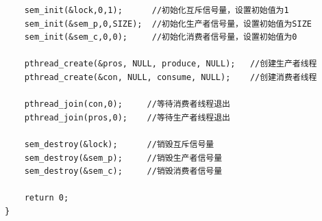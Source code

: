\documentclass[12pt, a4paper, oneside]{ctexbook}
\numberwithin{figure}{section}
\begin{document}
\begin{verbatim}
    sem_init(&lock,0,1);      //初始化互斥信号量，设置初始值为1
    sem_init(&sem_p,0,SIZE);  //初始化生产者信号量，设置初始值为SIZE
    sem_init(&sem_c,0,0);     //初始化消费者信号量，设置初始值为0
    
    pthread_create(&pros, NULL, produce, NULL);   //创建生产者线程
    pthread_create(&con, NULL, consume, NULL);    //创建消费者线程

    pthread_join(con,0);     //等待消费者线程退出
    pthread_join(pros,0);    //等待生产者线程退出

    sem_destroy(&lock);      //销毁互斥信号量
    sem_destroy(&sem_p);     //销毁生产者信号量
    sem_destroy(&sem_c);     //销毁消费者信号量

    return 0;
}

\end{verbatim}
\end{document}
